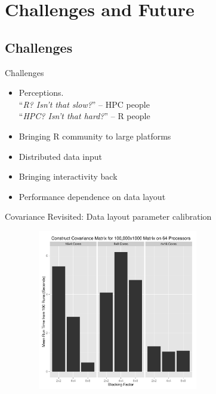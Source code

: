 \section{Challenges and Future}
\makesubcontentsslides

\subsection{Challenges}

\begin{frame}
  \begin{block}{Challenges}
    \begin{itemize}[<+-|alert@+>]
      \item Perceptions.\\
      ``\emph{R?  Isn't that slow?}'' -- HPC people\\
      ``\emph{HPC?  Isn't that hard?}'' -- R people
      \item Bringing R community to large platforms
      \item Distributed data input
      \item Bringing interactivity back
      \item Performance dependence on data layout
    \end{itemize}
  \end{block}
\end{frame}

\begin{frame}
  \begin{block}{Covariance Revisited: Data layout parameter calibration}
    \begin{center}
     \includegraphics[width=10cm, height=7cm]{../common/pics/cov_param}
    \end{center}
  \end{block}
\end{frame}

